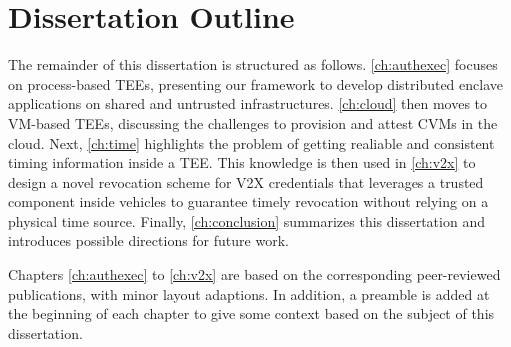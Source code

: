 \section{Dissertation Outline}
\label{thesis:intro-outline}

The remainder of this dissertation is structured as follows. \cref{ch:authexec}
focuses on process-based \acp{TEE}, presenting our framework to develop
distributed enclave applications on shared and untrusted infrastructures.
\cref{ch:cloud} then moves to \acs{VM}-based \acp{TEE}, discussing the
challenges to provision and attest \acp{CVM} in the cloud. Next, \cref{ch:time}
highlights the problem of getting realiable and consistent timing information
inside a \ac{TEE}. This knowledge is then used in \cref{ch:v2x} to design a
novel revocation scheme for \ac{V2X} credentials that leverages a trusted
component inside vehicles to guarantee timely revocation without relying on a
physical time source. Finally, \cref{ch:conclusion} summarizes this dissertation
and introduces possible directions for future work.

Chapters \ref{ch:authexec} to \ref{ch:v2x} are based on the corresponding
peer-reviewed publications, with minor layout adaptions. In addition, a preamble
is added at the beginning of each chapter to give some context based on the
subject of this dissertation.